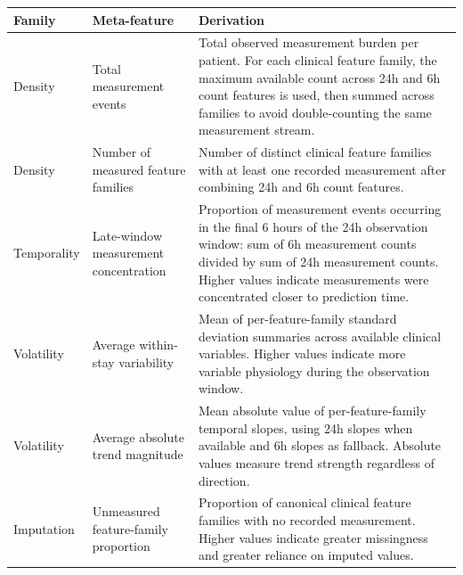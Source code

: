 \begin{tabular}{l l p{9cm}}
\toprule
Family & Meta-feature & Derivation \\
\midrule
Density & Total measurement events & Total observed measurement burden per patient. For each clinical feature family, the maximum available count across 24h and 6h count features is used, then summed across families to avoid double-counting the same measurement stream. \\
Density & Number of measured feature families & Number of distinct clinical feature families with at least one recorded measurement after combining 24h and 6h count features. \\
Temporality & Late-window measurement concentration & Proportion of measurement events occurring in the final 6 hours of the 24h observation window: sum of 6h measurement counts divided by sum of 24h measurement counts. Higher values indicate measurements were concentrated closer to prediction time. \\
Volatility & Average within-stay variability & Mean of per-feature-family standard deviation summaries across available clinical variables. Higher values indicate more variable physiology during the observation window. \\
Volatility & Average absolute trend magnitude & Mean absolute value of per-feature-family temporal slopes, using 24h slopes when available and 6h slopes as fallback. Absolute values measure trend strength regardless of direction. \\
Imputation & Unmeasured feature-family proportion & Proportion of canonical clinical feature families with no recorded measurement. Higher values indicate greater missingness and greater reliance on imputed values. \\
\bottomrule
\end{tabular}
